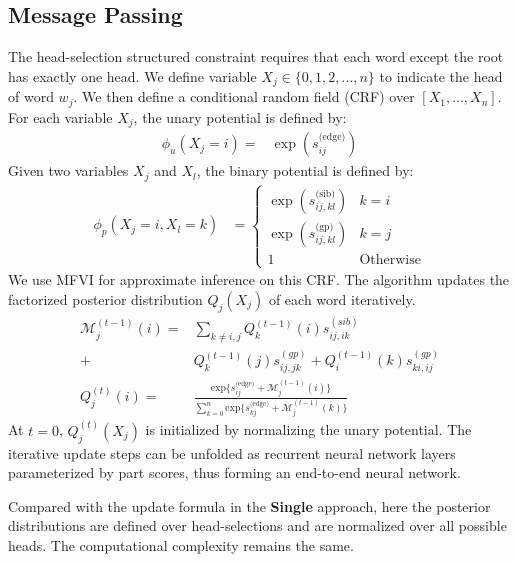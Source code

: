 \documentclass[11pt,a4paper]{article}
\begin{document}
\subsection{Message Passing}
The head-selection structured constraint requires that each word except the root has exactly one head.
We define variable $X_j\in\{0,1,2,\dots,n\}$ to indicate the head of word $w_j$. We then define a conditional random field (CRF) over $[X_1, \ldots, X_n]$. For each variable $X_j$, the unary potential is defined by:
\begin{align*}
    \phi_{u}(X_{j}=i)=&\exp(s_{ij}^{\textrm{(edge)}})
\end{align*}
Given two variables $X_j$ and $X_l$, the binary potential is defined by:
\begin{align*}
\phi_{p}(X_{j}=i,X_{l}=k)&=
\begin{cases}
\exp(s^{\text{(sib)}}_{ij,kl}) & k=i\\
\exp(s^{\text{(gp)}}_{ij,kl}) & k=j\\
1 & \text{Otherwise}
\end{cases}
\end{align*}
We use MFVI for approximate inference on this CRF. The algorithm updates the factorized posterior distribution $Q_{j}(X_j)$ of each word iteratively.
\begin{align*}
    \mathcal{M}^{(t-1)}_{j}(i)=&\sum_{k\neq i,j}Q^{(t-1)}_{k}(i)s^{(sib)}_{ij,ik}\\
    +&Q^{(t-1)}_{k}(j)s^{(gp)}_{ij,jk}+Q^{(t-1)}_{i}(k)s^{(gp)}_{ki,ij}\\
    Q_{j}^{(t)}(i) =&\frac{\mathrm{exp} \{s_{ij}^{\text{(edge)}}+\mathcal{M}^{(t-1)}_{j}(i)\}}{\sum\limits_{k=0}^n \mathrm{exp} \{s_{kj}^{\text{(edge)}}+\mathcal{M}^{(t-1)}_{j}(k)\}}     
\end{align*}
At $t=0$, $Q_{j}^{(t)}(X_j)$ is initialized by normalizing the unary potential.
The iterative update steps can be unfolded as recurrent neural network layers parameterized by part scores, thus forming an end-to-end neural network. 

Compared with the update formula in the \textbf{Single} approach, here the posterior distributions are defined over head-selections and are normalized over all possible heads. The computational complexity remains the same.
\end{document}
